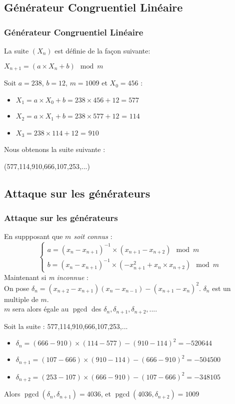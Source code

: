 \documentclass[utf8,10pt,french]{beamer}
\DeclareMathOperator{\pgcd}{pgcd}
\begin{document}
\subsection{Générateur Congruentiel Linéaire}
\begin{frame}
  \frametitle{Générateur Congruentiel Linéaire}
\begin{definition}
La suite $(X_{n})$ est définie de la façon suivante:
\begin{center}
$X_{n+1}=(a\times X_{n} + b) \mod{m} $ 
\end{center}
\end{definition}\pause
  
\begin{example}
Soit $a=238$, $b=12$,  $m=1009$ et $X_0=456$  : \\
\begin{itemize}
\item $X_1= a \times X_0 + b = 238 \times 456 + 12 = 577$
\item $X_2= a \times X_1 + b = 238\times 577 + 12$ = $114$
\item $X_3= 238 \times 114 + 12$ = $910$
\end{itemize}
Nous obtenons la suite suivante :
\begin{center}
(577,114,910,666,107,253,...)
\end{center}
\end{example}
\end{frame}

\subsection{Attaque sur les générateurs}
\begin{frame}
  \frametitle{Attaque sur les générateurs}
 En suppposant que \textit{$m$ soit connus} :
$$\begin{cases}
a=(x_{n}-x_{n+1})^{-1}\times(x_{n+1}-x_{n+2}) \mod{m}  \\
b=(x_{n}-x_{n+1})^{-1}\times(-x_{n+1}^2 + x_{n} \times x_{n+2}) \mod{m}
\end{cases}$$ \pause
Maintenant si \textit{m inconnue} : \\
On pose $\delta_{n}=(x_{n+2}-x_{n+1})(x_{n}-x_{n-1})-(x_{n+1}-x_{n})^2$.
$\delta_n$ est un multiple de $m$.\\ $m$ sera alors égale au $\pgcd$ des $\delta_{n},\delta_{n+1},\delta_{n+2},...$.\pause

\begin{example}
Soit la suite : 577,114,910,666,107,253,...
\begin{itemize}
\item $\delta_{n} = (666-910) \times (114-577) - (910-114)^2 = -520644$
\item $\delta_{n+1} = (107-666) \times (910-114) - (666-910)^2 = -504500$
\item $\delta_{n+2} = (253-107) \times (666-910) - (107-666)^2 = -348105$
\end{itemize}
Alors $\pgcd(\delta_n,\delta_{n+1})=4036$, et $\pgcd(4036,\delta_{n+2})=1009$
\end{example}
\end{frame}
\end{document}
